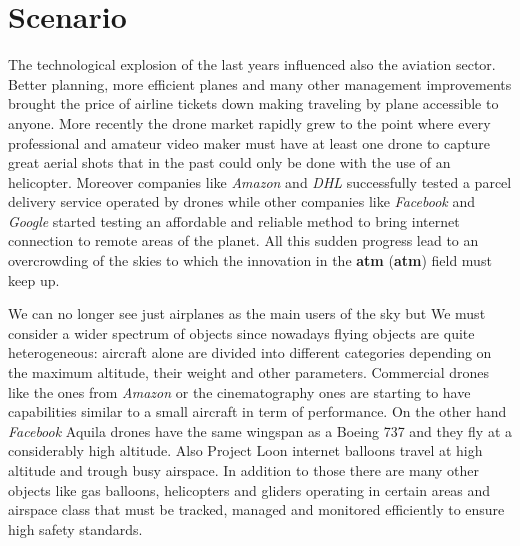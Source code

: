 \documentclass[../main.tex]{subfiles}
\begin{document}
\chapter{Scenario}
\label{chap:avionicsprot}

The technological explosion of the last years influenced also the aviation sector. Better planning, more efficient planes and many other management improvements brought the price of airline tickets down making traveling by plane accessible to anyone. More recently the drone market rapidly grew to the point where every professional and amateur video maker must have at least one drone to capture great aerial shots that in the past could only be done with the use of an helicopter. Moreover companies like \textit{Amazon} and \textit{DHL} successfully tested a parcel delivery service operated by drones\cite{primeair} while other companies like \textit{Facebook} and \textit{Google} started testing an affordable and reliable method to bring internet connection to remote areas of the planet\cite{loon}. All this sudden progress lead to an overcrowding of the skies to which the innovation in the  \textbf{\acrlong{atm}} (\textbf{\acrshort{atm}}) field must keep up.

We can no longer see just airplanes as the main users of the sky but We must consider a wider spectrum of objects since nowadays flying objects are quite heterogeneous: aircraft alone are divided into different categories depending on the maximum altitude, their weight and other parameters. Commercial drones like the ones from \textit{Amazon} or the cinematography ones are starting to have capabilities similar to a small aircraft in term of performance. On the other hand \textit{Facebook} Aquila drones have the same wingspan as a Boeing 737 and they fly at a considerably high altitude\cite{fbaquila}. Also Project Loon internet balloons travel at high altitude and trough busy airspace. In addition to those there are many other objects like gas balloons, helicopters and gliders operating in certain areas and airspace class that must be tracked, managed and monitored efficiently to ensure high safety standards.
\end{document}
